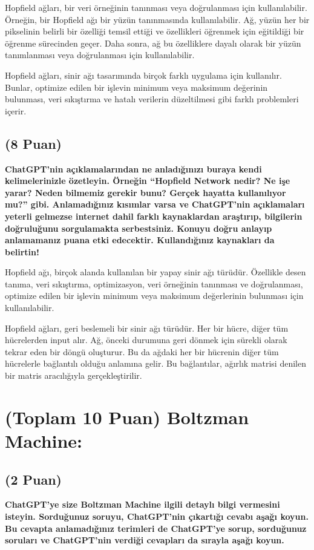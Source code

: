 \documentclass[11pt]{article}
\begin{document}
Hopfield ağları, bir veri örneğinin tanınması veya doğrulanması için kullanılabilir. Örneğin, bir Hopfield ağı bir yüzün tanınmasında kullanılabilir. Ağ, yüzün her bir pikselinin belirli bir özelliği temsil ettiği ve özellikleri öğrenmek için eğitildiği bir öğrenme sürecinden geçer. Daha sonra, ağ bu özelliklere dayalı olarak bir yüzün tanımlanması veya doğrulanması için kullanılabilir.

Hopfield ağları, sinir ağı tasarımında birçok farklı uygulama için kullanılır. Bunlar, optimize edilen bir işlevin minimum veya maksimum değerinin bulunması, veri sıkıştırma ve hatalı verilerin düzeltilmesi gibi farklı problemleri içerir.


\subsection{(8 Puan)} \textbf{ChatGPT’nin açıklamalarından ne anladığınızı buraya kendi kelimelerinizle özetleyin. Örneğin ``Hopfield Network nedir? Ne işe yarar? Neden bilmemiz gerekir bunu? Gerçek hayatta kullanılıyor mu?'' gibi. Anlamadığınız kısımlar varsa ve ChatGPT’nin açıklamaları yeterli gelmezse internet dahil farklı kaynaklardan araştırıp, bilgilerin doğruluğunu sorgulamakta serbestsiniz. Konuyu doğru anlayıp anlamamanız puana etki edecektir. Kullandığınız kaynakları da belirtin!}

Hopfield ağı, birçok alanda kullanılan bir yapay sinir ağı türüdür. Özellikle desen tanıma, veri sıkıştırma, optimizasyon, veri örneğinin tanınması ve doğrulanması, optimize edilen bir işlevin minimum veya maksimum değerlerinin bulunması için kullanılabilir.

Hopfield ağları, geri beslemeli bir sinir ağı türüdür. Her bir hücre, diğer tüm hücrelerden input alır. Ağ, önceki durumuna geri dönmek için sürekli olarak tekrar eden bir döngü oluşturur. Bu da ağdaki her bir hücrenin diğer tüm hücrelerle bağlantılı olduğu anlamına gelir. Bu bağlantılar, ağırlık matrisi denilen bir matris aracılığıyla gerçekleştirilir.


\section{(Toplam 10 Puan) Boltzman Machine:}

\subsection{(2 Puan)} \textbf{ChatGPT’ye size Boltzman Machine ilgili detaylı bilgi vermesini isteyin. Sorduğunuz soruyu, ChatGPT'nin çıkartığı cevabı aşağı koyun. Bu cevapta anlamadığınız terimleri de ChatGPT’ye sorup, sorduğunuz soruları ve ChatGPT’nin verdiği cevapları da sırayla aşağı koyun.}
\end{document}

